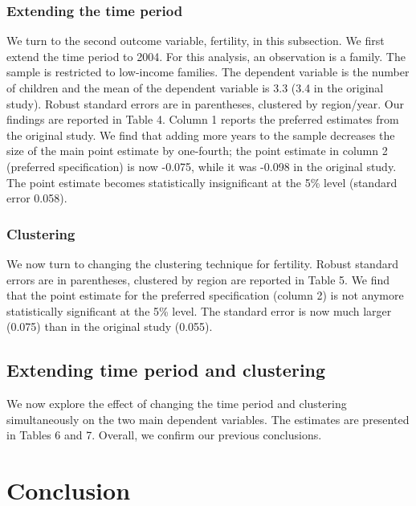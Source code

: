 \documentclass[12pt,a4paper]{article}
\begin{document}
\begin{spacing}{1.5}
\subsubsection{Extending the time period}

We turn to the second outcome variable, fertility, in this subsection. We first extend the time period to 2004. For this analysis, an observation is a family. The sample is restricted to low-income families. The dependent variable is the number of children and the mean of the dependent variable is 3.3 (3.4 in the original study). Robust standard errors are in parentheses, clustered by region/year. Our findings are reported in Table 4. Column 1 reports the preferred estimates from the original study.
We find that adding more years to the sample decreases the size of the main point estimate by one-fourth; the point estimate in column 2 (preferred specification) is now -0.075, while it was -0.098 in the original study. The point estimate becomes statistically insignificant at the 5\% level (standard error 0.058).


\subsubsection{Clustering}

We now turn to changing the clustering technique for fertility. Robust standard errors are in parentheses, clustered by region are reported in Table 5. We find that the point estimate for the preferred specification (column 2) is not anymore statistically significant at the 5\% level. The standard error is now much larger (0.075) than in the original study (0.055).

\subsection{Extending time period and clustering}

We now explore the effect of changing the time period and clustering simultaneously on the two main dependent variables. The estimates are presented in Tables 6 and 7. Overall, we confirm our previous conclusions. 

\end{spacing}
\section{Conclusion}
\end{document}
